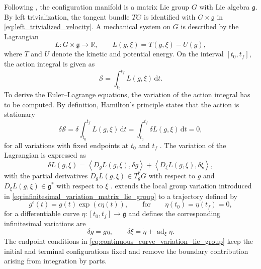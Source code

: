 Following \cite{Lee2008}, the configuration manifold is a matrix Lie group $G$ with Lie algebra $\mathfrak g$. By left trivialization, the tangent bundle $TG$ is identified with $G\times\mathfrak g$ in \eqref{eq:left_trivialized_velocity}.
A mechanical system on $G$ is described by the Lagrangian
\begin{equation}
    L:G\times\mathfrak g\rightarrow\mathbb R,
    \qquad
    L(g,\xi)=T(g,\xi)-U(g),
    \label{eq:continuous_lagrangian_lie_group}
\end{equation}
where $T$ and $U$ denote the kinetic and potential energy. On the interval $[t_0,t_f]$, the action integral is given as
\begin{equation}
    \mathcal S
    =
    \int_{t_0}^{t_f}L(g,\xi)\,\mathrm dt.
    \label{eq:continuous_action_integral}
\end{equation}
To derive the Euler--Lagrange equations, the variation of the action integral has to be computed. By definition, Hamilton's principle states that the action is stationary
\begin{equation}
    \delta\mathcal S
    =
    \delta\int_{t_0}^{t_f}L(g,\xi)\,\mathrm dt
    =
    \int_{t_0}^{t_f}\delta L(g,\xi)\,\mathrm dt
    =
    0,
    \label{eq:hamilton_principle_lie_group}
\end{equation}
for all variations with fixed endpoints at $t_0$ and $t_f$ \cite{Lee2008,Marsden2001}.
The variation of the Lagrangian is expressed as
\begin{equation}
    \delta L(g,\xi)
    =
    \left\langle D_gL(g,\xi),\delta g\right\rangle
    +
    \left\langle D_{\xi}L(g,\xi),\delta\xi\right\rangle,
    \label{eq:variation_continuous_lagrangian}
\end{equation}
with the partial derivatives $D_gL(g,\xi)\in T_g^*G$ with respect to $g$ and $D_{\xi}L(g,\xi)\in\mathfrak g^*$ with respect to $\xi$ \cite{Marsden2001}.
\cite{Lee2008} extends the local group variation introduced in \eqref{eq:infinitesimal_variation_matrix_lie_group} to a trajectory defined by
\begin{equation}
    g^{\epsilon}(t)
    =
    g(t)\exp(\epsilon\eta(t)),
    \qquad
    \text{for}
    \qquad
    \eta(t_0)=\eta(t_f)=0,
    \label{eq:continuous_curve_variation_lie_group}
\end{equation}
for a differentiable curve $\eta:[t_0,t_f]\rightarrow\mathfrak g$ and defines the corresponding infinitesimal variations are
\begin{equation}
    \delta g=g\eta,
    \qquad
    \delta\xi
    =
    \dot\eta+\operatorname{ad}_{\xi}\eta.
    \label{eq:continuous_lie_group_variations}
\end{equation}
The endpoint conditions in \eqref{eq:continuous_curve_variation_lie_group} keep the initial and terminal configurations fixed and remove the boundary contribution arising from integration by parts.


